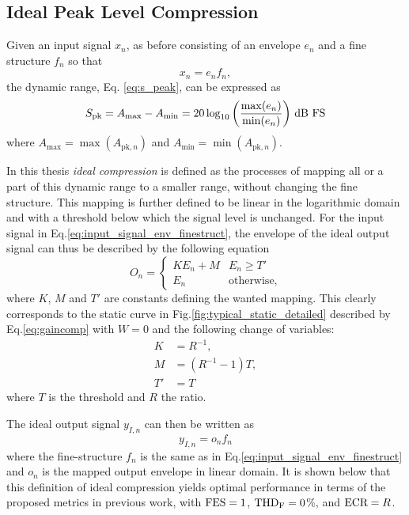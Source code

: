 \documentclass[../main2.tex]{subfiles}
\begin{document}
\FloatBarrier
\subsection{Ideal Peak Level Compression}\label{method_ideal_peak_compression}
Given an input signal $x_n$, as before consisting of an envelope $e_n$ and a fine structure $f_n$ so that
\begin{equation}\label{eq:input_signal_env_finestruct}
x_n = e_n f_n,
\end{equation}
the dynamic range, Eq. \eqref{eq:s_peak}, can be expressed as
\begin{equation}
S_\text{pk} =A_\text{max} - A_\text{min} = 20 \log_{10} \left(\frac{\max(e_n)}{\min(e_n)}\right) \mskip3mu\text{dB FS}
\end{equation}
where $A_\text{max} = \max(A_{\text{pk},n})$ and $A_\text{min} =  \min(A_{\text{pk},n})$.
 
In this thesis \emph{ideal compression} is defined as the processes of mapping all or a part of this dynamic range to a smaller range, without changing the fine structure. This mapping is further defined to be linear in the logarithmic domain and with a threshold below which the signal level is unchanged. For the input signal in Eq.\eqref{eq:input_signal_env_finestruct}, the envelope of the ideal output signal can thus be described by the following equation
\begin{equation}\label{eq:dynamic_range_mapping}
O_n =
\begin{cases}
	K E_n + M 					& E_n \geq T'  \\
	E_n							& \text{otherwise},
\end{cases}
\end{equation}
where $K$, $M$ and $T'$ are constants defining the wanted mapping. This clearly corresponds to the static curve in Fig.\ref{fig:typical_static_detailed} described by Eq.\eqref{eq:gaincomp} with $W=0$ and the following change of variables:
\begin{equation}
\begin{split}
K &= R^{-1}, \\
M &= (R^{-1}-1)T,\\
T' &= T
\end{split}
\end{equation}
where $T$ is the threshold and $R$ the ratio.

The ideal output signal $y_{I,n}$ can then be written as
\begin{equation}\label{eq:ideal_output}
y_{I,n} = o_n f_n
\end{equation}
where the fine-structure $f_n$ is the same as in Eq.\eqref{eq:input_signal_env_finestruct} and $o_n$ is the mapped output envelope in linear domain. It is shown below that this definition of ideal compression yields optimal performance in terms of the proposed metrics in previous work, with $\text{FES} = 1$, $\text{THD}_\text{F}=0$\%, and $\text{ECR}=R$.
\end{document}
